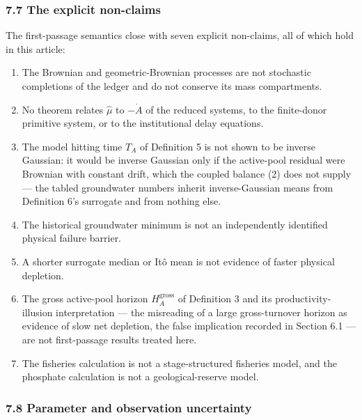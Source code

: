 \documentclass[11pt]{article}
\providecommand{\tightlist}{\setlength{\itemsep}{0pt}\setlength{\parskip}{0pt}}
\begin{document}
\subsubsection{7.7 The explicit
non-claims}\label{the-explicit-non-claims}

The first-passage semantics close with seven explicit non-claims, all of
which hold in this article:

\begin{enumerate}
\def\labelenumi{\arabic{enumi}.}
\tightlist
\item
  The Brownian and geometric-Brownian processes are not stochastic
  completions of the ledger and do not conserve its mass compartments.
\item
  No theorem relates \(\widehat\mu\) to \(-\dot A\) of the reduced
  systems, to the finite-donor primitive system, or to the institutional
  delay equations.
\item
  The model hitting time \(T_A\) of Definition 5 is not shown to be
  inverse Gaussian: it would be inverse Gaussian only if the active-pool
  residual were Brownian with constant drift, which the coupled balance
  (2) does not supply --- the tabled groundwater numbers inherit
  inverse-Gaussian means from Definition 6's surrogate and from nothing
  else.
\item
  The historical groundwater minimum is not an independently identified
  physical failure barrier.
\item
  A shorter surrogate median or It\^o mean is not evidence of faster
  physical depletion.
\item
  The gross active-pool horizon \(H_A^{\mathrm{gross}}\) of Definition 3
  and its productivity-illusion interpretation --- the misreading of a
  large gross-turnover horizon as evidence of slow net depletion, the
  false implication recorded in Section 6.1 --- are not first-passage
  results treated here.
\item
  The fisheries calculation is not a stage-structured fisheries model,
  and the phosphate calculation is not a geological-reserve model.
\end{enumerate}

\subsubsection{7.8 Parameter and observation
uncertainty}\label{parameter-and-observation-uncertainty}
\end{document}
